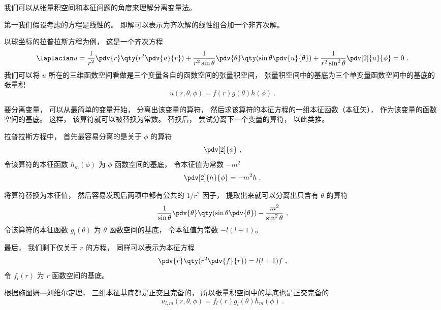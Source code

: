 

我们可以从张量积空间和本征问题的角度来理解分离变量法。

第一我们假设考虑的方程是线性的。 即解可以表示为齐次解的线性组合加一个非齐次解。

以球坐标的拉普拉斯方程为例， 这是一个齐次方程
\begin{equation}
\laplacian u = \frac{1}{r^2} \pdv{r} \qty(r^2 \pdv{u}{r}) + \frac{1}{r^2 \sin\theta}\pdv{\theta} \qty(\sin \theta \pdv{u}{\theta}) + \frac{1}{r^2 \sin^2 \theta} \pdv[2]{u}{\phi} = 0~.
\end{equation}
我们可以将 $u$ 所在的三维函数空间看做是三个变量各自的函数空间的张量积空间， 张量积空间中的基底为三个单变量函数空间中的基底的张量积
\begin{equation}
u(r, \theta, \phi) = f(r) g(\theta) h(\phi)~.
\end{equation}

要分离变量， 可以从最简单的变量开始， 分离出该变量的算符， 然后求该算符的本征方程的一组本征函数（本征矢）， 作为该变量的函数空间的基底。 这样， 该算符就可以被替换为常数。 替换后， 尝试分离下一个变量的算符， 以此类推。

拉普拉斯方程中， 首先最容易分离的是关于 $\phi$ 的算符
\begin{equation}
\pdv[2]{\phi}~,
\end{equation}
令该算符的本征函数 $h_m(\phi)$ 为 $\phi$ 函数空间的基底， 令本征值为常数 $-m^2$
\begin{equation}
\pdv[2]{h}{\phi} = -m^2 h~.
\end{equation}
 
将算符替换为本征值， 然后容易发现后两项中都有公共的 $1/r^2$ 因子， 提取出来就可以分离出只含有 $\theta$ 的算符
\begin{equation}
 \frac{1}{\sin\theta}\pdv{\theta} \qty(\sin \theta \pdv{\theta}) - \frac{m^2}{\sin^2 \theta}~,
\end{equation}
令该算符的本征函数 $g_l(\theta)$ 为 $\theta$ 函数空间的基底， 令本征值为常数 $-l(l+1)$。

最后， 我们剩下仅关于 $r$ 的方程， 同样可以表示为本征方程
\begin{equation}
\pdv{r} \qty(r^2 \pdv{f}{r}) = l(l+1) f~,
\end{equation}
令 $f_l(r)$ 为 $r$ 函数空间的基底。

根据施图姆—刘维尔定理， 三组本征基底都是正交且完备的， 所以张量积空间中的基底也是正交完备的
\begin{equation}
u_{l,m}(r, \theta, \phi) = f_l(r) g_l(\theta) h_m(\phi)~.
\end{equation}
